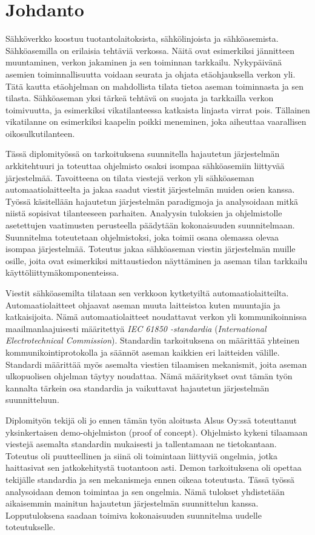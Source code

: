 \chapter{Johdanto}
\label{ch:johdanto}
Sähköverkko koostuu tuotantolaitoksista, sähkölinjoista ja sähköasemista. Sähköasemilla on erilaisia tehtäviä verkossa. Näitä ovat esimerkiksi jännitteen muuntaminen, verkon jakaminen ja sen toiminnan tarkkailu. Nykypäivänä asemien toiminnallisuutta voidaan seurata ja ohjata etäohjauksella verkon yli. Tätä kautta etäohjelman on mahdollista tilata tietoa aseman toiminnasta ja sen tilasta. Sähköaseman yksi tärkeä tehtävä on suojata ja tarkkailla verkon toimivuutta, ja esimerkiksi vikatilanteessa katkaista linjasta virrat pois. Tällainen vikatilanne on esimerkiksi kaapelin poikki meneminen, joka aiheuttaa vaarallisen oikosulkutilanteen.

Tässä diplomityössä on tarkoituksena suunnitella hajautetun järjestelmän arkkitehtuuri ja toteuttaa ohjelmisto osaksi isompaa sähköasemiin liittyvää järjestelmää. Tavoitteena on tilata viestejä verkon yli sähköaseman automaatiolaitteelta ja jakaa saadut viestit järjestelmän muiden osien kanssa. Työssä käsitellään hajautetun järjestelmän paradigmoja ja analysoidaan mitkä niistä sopisivat tilanteeseen parhaiten. Analyysin tuloksien ja ohjelmistolle asetettujen vaatimusten perusteella päädytään kokonaisuuden suunnitelmaan. Suunnitelma toteutetaan ohjelmistoksi, joka toimii osana olemassa olevaa isompaa järjestelmää. Toteutus jakaa sähköaseman viestin järjestelmän muille osille, joita ovat esimerkiksi mittaustiedon näyttäminen ja aseman tilan tarkkailu käyttöliittymäkomponenteissa.

Viestit sähköasemilta tilataan sen verkkoon kytketyiltä automaatiolaitteilta. Automaatiolaitteet ohjaavat aseman muuta laitteistoa kuten muuntajia ja katkaisijoita. Nämä automaatiolaitteet noudattavat verkon yli kommunikoinnissa maailmanlaajuisesti määritettyä \emph{IEC 61850 -standardia} (\emph{International Electrotechnical Commission}). Standardin tarkoituksena on määrittää yhteinen kommunikointiprotokolla ja säännöt aseman kaikkien eri laitteiden välille. Standardi määrittää myös asemalta viestien tilaamisen mekanismit, joita aseman ulkopuolisen ohjelman täytyy noudattaa. Nämä määritykset ovat tämän työn kannalta tärkein osa standardia ja vaikuttavat hajautetun järjestelmän suunnitteluun.

Diplomityön tekijä oli jo ennen tämän työn aloitusta Alsus Oy:ssä toteuttanut yksinkertaisen demo-ohjelmiston (proof of concept). Ohjelmisto kykeni tilaamaan viestejä asemalta standardin mukaisesti ja tallentamaan ne tietokantaan. Toteutus oli puutteellinen ja siinä oli toimintaan liittyviä ongelmia, jotka haittasivat sen jatkokehitystä tuotantoon asti. Demon tarkoituksena oli opettaa tekijälle standardia ja sen mekanismeja ennen oikeaa toteutusta. Tässä työssä analysoidaan demon toimintaa ja sen ongelmia. Nämä tulokset yhdistetään aikaisemmin mainitun hajautetun järjestelmän suunnittelun kanssa. Lopputuloksena saadaan toimiva kokonaisuuden suunnitelma uudelle toteutukselle.

